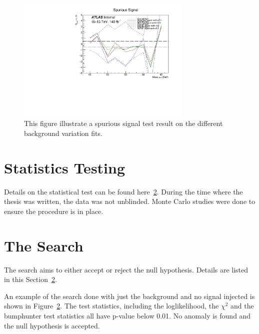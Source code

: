 \begin{itemize}
\begin{figure}[!htb]
    \begin{center}
        \includegraphics[width=0.75\textwidth]{figures/chapter_dimuon/spurious}        
        \caption{
        This figure illustrate a spurious signal test result on the different background variation fits.}
            \label{fig:dimuonstudies}
    \end{center}
\end{figure}

\section{Statistics Testing}
Details on the statistical test can be found here~\ref{}. During the time where the thesis was written, the data was not unblinded. Monte Carlo studies were done to ensure the procedure is in place. 

\section{The Search}
The search aims to either accept or reject the null hypothesis. Details are listed in this Section~\ref{}.

An example of the search done with just the background and no signal injected is shown in Figure~\ref{}. The test statistics, including 
the loglikelihood, the $\chi^{2}$ and the bumphunter test statistics all have p-value below 0.01. No anomaly is found and the null hypothesis is accepted.
    

\end{itemize}
